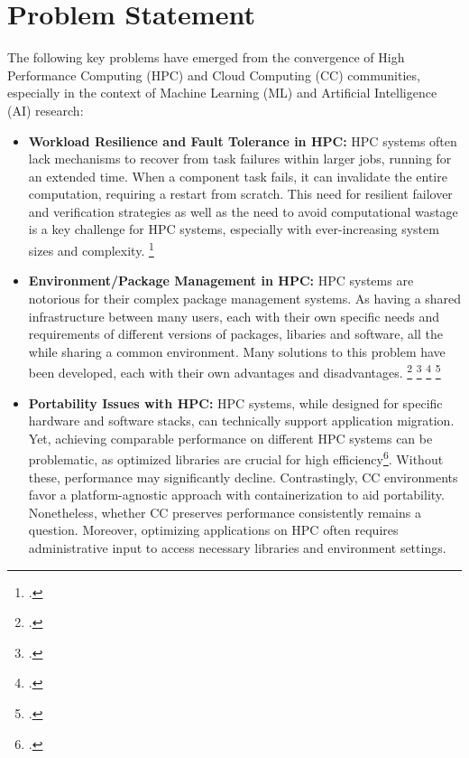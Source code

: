 \newpage

\section{Problem Statement}
\label{ProblemStatement}

The following key problems have emerged from the convergence of High Performance Computing (HPC) and Cloud Computing (CC) communities, especially in the context of Machine Learning (ML) and Artificial Intelligence (AI) research:

\begin{itemize}

    \item \textbf{Workload Resilience and Fault Tolerance in \ac{HPC}:} 
        \ac{HPC} systems often lack mechanisms to recover from task failures within
        larger jobs, running for an extended time.
        When a component task fails, it can invalidate the entire
        computation, requiring a restart from scratch.
        This need for resilient failover and verification strategies as well as the need to avoid
        computational wastage is a key challenge for \ac{HPC} systems, especially with ever-increasing system sizes and complexity.
        \footcite{egwutuohaSurveyFaultTolerance2013}

    \item \textbf{Environment/Package Management in \ac{HPC}:} 
        \ac{HPC} systems are notorious for their complex package management systems.
        As having a shared infrastructure between many users, each with their own specific needs and requirements of different versions of packages, libaries and software,
        all the while sharing a common environment.
        Many solutions to this problem have been developed, each with their own advantages and disadvantages.
        \footcite{duboisWhyJohnnyCan2003} \footcite{bzeznikNixHPCPackage2017} \footcite{gamblinSpackPackageManager2015} \footcite{hosteEasyBuildBuildingSoftware2012}

    \item \textbf{Portability Issues with \ac{HPC}:}
        \ac{HPC} systems, while
        designed for specific hardware and software stacks, can technically support
        application migration. Yet, achieving comparable performance on different
        HPC systems can be problematic, as optimized libraries are crucial for high
        efficiency\footcite{canonCasePortabilityReproducibility2019}. Without these,
        performance may significantly decline. Contrastingly,
        \ac{CC} environments favor a platform-agnostic approach with
        containerization to aid portability. Nonetheless, whether \ac{CC} preserves
        performance consistently remains a question. Moreover, optimizing
        applications on HPC often requires administrative input to access
        necessary libraries and environment settings.
        

\end{itemize}
